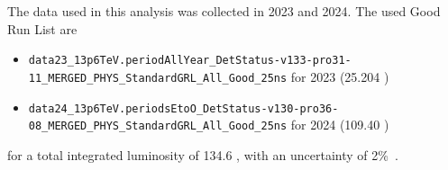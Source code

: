 The data used in this analysis was collected in 2023 and 2024.
The used Good Run List are 
\begin{itemize}
    \item \texttt{data23\_13p6TeV.periodAllYear\_DetStatus-v133-pro31-11\_MERGED\_PHYS\_StandardGRL\_All\_Good\_25ns} for 2023 (25.204 \fbinv)
    \item \texttt{data24\_13p6TeV.periodsEtoO\_DetStatus-v130-pro36-08\_MERGED\_PHYS\_StandardGRL\_All\_Good\_25ns} for 2024 (109.40 \fbinv)
\end{itemize}

for a total integrated luminosity of 134.6 \fbinv, with an uncertainty of 2\%~\cite{lumi}. 
